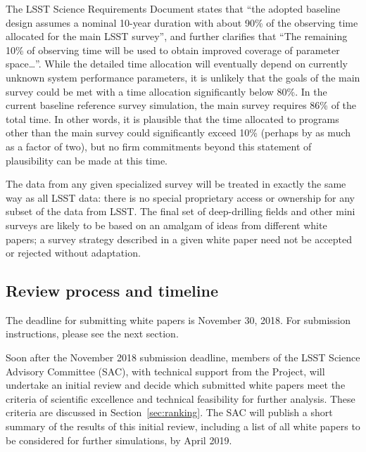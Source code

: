 \documentclass[DM,lsstdraft,toc,usenatbib]{lsstdoc}
\begin{document}
The LSST Science Requirements Document states that ``the adopted baseline design assumes a 
nominal 10-year duration with about 90\% of the observing time allocated for the main LSST survey'',
and further clarifies that ``The remaining 10\% of observing time will be used to obtain improved 
coverage of parameter space\dots''. While the detailed time allocation will eventually depend on currently unknown system
performance parameters, it is unlikely that the goals of the main survey could be met with a time allocation
significantly below 80\%. In the current baseline reference survey simulation, the main survey requires 86\% of the total time.
In other words, it is plausible that the time allocated to programs other
than the main survey could significantly exceed 10\% (perhaps by as much as a factor of two), but 
no firm commitments beyond this statement of plausibility can be made at this time. 

The data from any given specialized survey will be treated in exactly the same way as all LSST 
data: there is no special proprietary access or ownership for any subset of the data from LSST. The final set of 
deep-drilling fields and other mini surveys are likely to be based on an amalgam of ideas from different 
white papers; a survey strategy described in a given white paper need not be accepted or rejected without adaptation.


\subsection{Review process and timeline}

The deadline for submitting white papers is November 30, 2018. For submission instructions, 
please see the next section. 

Soon after the November 2018 submission deadline, members of the LSST Science Advisory Committee (SAC), 
with technical support from the Project, 
will undertake an initial review and decide which submitted white papers meet the criteria of scientific excellence and 
technical feasibility for further analysis. These criteria are discussed in Section~\ref{sec:ranking}. The SAC will publish 
a short summary of the results of this initial review, including a list of all white papers to be considered for further 
simulations, by April 2019. 
\end{document}
